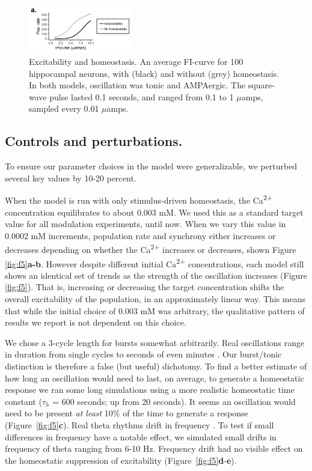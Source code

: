 \documentclass{article}
\begin{document}
\begin{figure}
\centering
\includegraphics[width=0.4\textwidth]{fig4.png}
\caption{\label{fig:f4}
Excitability and homeostasis. An average FI-curve for 100 hippocampal neurons, with (black) and without (grey) homeostasis. In both models, oscillation was tonic and AMPAergic. The square-wave pulse lasted 0.1 seconds, and ranged from 0.1 to 1 $\mu$amps, sampled every 0.01 $\mu$amps.
}
\end{figure}

\subsection*{Controls and perturbations.}
To ensure our parameter choices in the model were generalizable, we perturbed several key values by 10-20 percent.

When the model is run with only stimulus-driven homeostasis, the Ca\textsuperscript{2+} concentration equilibrates to about 0.003 mM. We used this as a standard target value for all modulation experiments, until now. When we vary this value in 0.0002 mM increments, population rate and synchrony either increases or decreases depending on whether the Ca\textsuperscript{2+} increases or decreases, shown Figure \ref{fig:f5}\textbf{a-b}. However despite different initial Ca\textsuperscript{2+} concentrations, each model still shows an identical set of trends as the strength of the oscillation increases (Figure \ref{fig:f5}). That is, increasing or decreasing the target concentration shifts the overall excitability of the population, in an approximately linear way. This means that while the initial choice of 0.003 mM was arbitrary, the qualitative pattern of results we report is not dependent on this choice.

We chose a 3-cycle length for bursts somewhat arbitrarily. Real oscillations range in duration from single cycles to seconds of even minutes \cite{Lundqvist2016,vanEde2018}. Our burst/tonic distinction is therefore a false (but useful) dichotomy. To find a better estimate of how long an oscillation would need to last, on average, to generate a homeostatic response we ran some long simulations using a more realistic homeostatic time constant ($\tau_h$ = 600 seconds; up from 20 seconds). It seems an oscillation would need to be present \textit{at least} 10\% of the time to generate a response (Figure~\ref{fig:f5}\textbf{c}). 
Real theta rhythms drift in frequency \cite{Buzsaki2015}. To test if small differences in frequency have a notable effect, we simulated small drifts in frequency of theta ranging from 6-10 Hz. Frequency drift had no visible effect on the homeostatic suppression of excitability (Figure~\ref{fig:f5}\textbf{d}-\textbf{e}).
\end{document}
